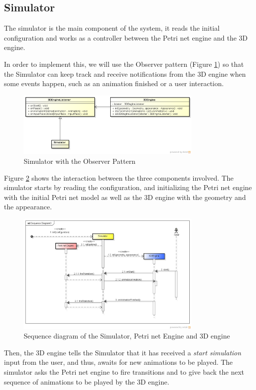 \subsection{Simulator}

The simulator is the main component of the system, it reads the initial configuration and works as a controller between the Petri net engine and the 3D engine.

In order to implement this, we will use the Observer pattern (Figure \ref{fig:observer-pattern}) so that the Simulator can keep track and receive notifications from the 3D engine when some events happen, such as an animation finished or a user interaction.

\begin{figure}[htp]
\begin{center}
  \includegraphics[width=0.8\textwidth]{image/ObserverPattern.png}
  \caption{Simulator with the Observer Pattern}
  \label{fig:observer-pattern}
\end{center}
\end{figure}

Figure \ref{fig:sd-engines} shows the interaction between the three components involved. The simulator starts by reading the configuration, and initializing the Petri net engine with the initial Petri net model as well as the 3D engine with the geometry and the appearance. 

\begin{figure}[htp]
\begin{center}
  \includegraphics[width=0.8\textwidth]{image/sd-engines.png}
  \caption{Sequence diagram of the Simulator, Petri net Engine and 3D engine}
  \label{fig:sd-engines}
\end{center}
\end{figure}

Then, the 3D engine tells the Simulator that it has received a \textit{start simulation} input from the user, and thus, awaits for new animations to be played. The simulator asks the Petri net engine to fire transitions and to give back the next sequence of animations to be played by the 3D engine.